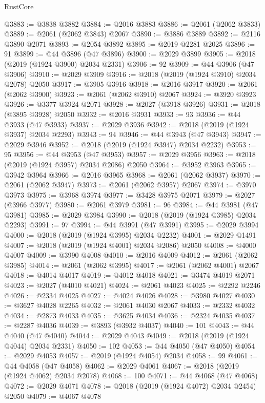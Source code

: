 \begin{lexlean}{RustCore}
\begin{coremodule}
@3883 := @3838 @3882
@3884 := @2016 @3883
@3886 := @2061 (@2062 @3833)
@3889 := @2061 (@2062 @3843) @2067
@3890 := @3886 @3889
@3892 := @2116 @3890 @2071
@3893 := @2054 @3892
@3895 := @2019 @2281 @2025
@3896 := 91
@3899 := @44 @3896 (@47 @3896)
@3900 := @2029 @3899
@3905 := @2018 (@2019 (@1924 @3900) @2034 @2331)
@3906 := 92
@3909 := @44 @3906 (@47 @3906)
@3910 := @2029 @3909
@3916 := @2018 (@2019 (@1924 @3910) @2034 @2078) @2050
@3917 := @3905 @3916
@3918 := @2016 @3917
@3920 := @2061 (@2062 @3900)
@3923 := @2061 (@2062 @3910) @2067
@3924 := @3920 @3923
@3926 := @3377 @3924 @2071
@3928 := @2027 (@3918 @3926)
@3931 := @2018 (@3895 @3928) @2050
@3932 := @2016 @3931
@3933 := 93
@3936 := @44 @3933 (@47 @3933)
@3937 := @2029 @3936
@3942 := @2018 (@2019 (@1924 @3937) @2034 @2293)
@3943 := 94
@3946 := @44 @3943 (@47 @3943)
@3947 := @2029 @3946
@3952 := @2018 (@2019 (@1924 @3947) @2034 @2232)
@3953 := 95
@3956 := @44 @3953 (@47 @3953)
@3957 := @2029 @3956
@3963 := @2018 (@2019 (@1924 @3957) @2034 @2086) @2050
@3964 := @3952 @3963
@3965 := @3942 @3964
@3966 := @2016 @3965
@3968 := @2061 (@2062 @3937)
@3970 := @2061 (@2062 @3947)
@3973 := @2061 (@2062 @3957) @2067
@3974 := @3970 @3973
@3975 := @3968 @3974
@3977 := @3428 @3975 @2071
@3979 := @2027 (@3966 @3977)
@3980 := @2061 @3979
@3981 := 96
@3984 := @44 @3981 (@47 @3981)
@3985 := @2029 @3984
@3990 := @2018 (@2019 (@1924 @3985) @2034 @2293)
@3991 := 97
@3994 := @44 @3991 (@47 @3991)
@3995 := @2029 @3994
@4000 := @2018 (@2019 (@1924 @3995) @2034 @2232)
@4001 := @2029 @1491
@4007 := @2018 (@2019 (@1924 @4001) @2034 @2086) @2050
@4008 := @4000 @4007
@4009 := @3990 @4008
@4010 := @2016 @4009
@4012 := @2061 (@2062 @3985)
@4014 := @2061 (@2062 @3995)
@4017 := @2061 (@2062 @4001) @2067
@4018 := @4014 @4017
@4019 := @4012 @4018
@4021 := @3474 @4019 @2071
@4023 := @2027 (@4010 @4021)
@4024 := @2061 @4023
@4025 := @2292 @2246
@4026 := @2334 @4025
@4027 := @4024 @4026
@4028 := @3980 @4027
@4030 := @3627 @4028 @2265
@4032 := @2061 @4030 @2067
@4033 := @2332 @4032
@4034 := @2873 @4033
@4035 := @3625 @4034
@4036 := @2324 @4035
@4037 := @2287 @4036
@4039 := @3893 (@3932 @4037)
@4040 := 101
@4043 := @44 @4040 (@47 @4040)
@4044 := @2029 @4043
@4049 := @2018 (@2019 (@1924 @4044) @2034 @2331)
@4050 := 102
@4053 := @44 @4050 (@47 @4050)
@4054 := @2029 @4053
@4057 := @2019 (@1924 @4054) @2034
@4058 := 99
@4061 := @44 @4058 (@47 @4058)
@4062 := @2029 @4061
@4067 := @2018 (@2019 (@1924 @4062) @2034 @2078)
@4068 := 100
@4071 := @44 @4068 (@47 @4068)
@4072 := @2029 @4071
@4078 := @2018 (@2019 (@1924 @4072) @2034 @2454) @2050
@4079 := @4067 @4078

\end{coremodule}
\end{lexlean}
